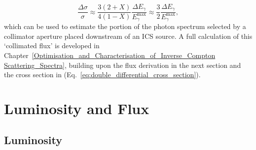 \documentclass[../main.tex]{subfiles}
\begin{document}
\begin{equation}
\frac{\Delta\sigma}{\sigma} \approx \frac{3\left(2+X\right)}{4\left(1-X\right)}\frac{\Delta E_{\gamma}}{E_{\gamma}^{\mathrm{max}}} \approx \frac{3}{2}\frac{\Delta E_{\gamma}}{E_{\gamma}^{\mathrm{max}}},
\label{eq:cross_section_factor}    
\end{equation}
which can be used to estimate the portion of the photon spectrum selected by a collimator aperture placed downstream of an ICS source. A full calculation of this `collimated flux' is developed in Chapter~\ref{Optimisation_and_Characterisation_of_Inverse_Compton Scattering_Spectra}, building upon the flux derivation in the next section and the cross section in (Eq.~\ref{eq:double_differential_cross_section}). 

\section{Luminosity and Flux}
\label{sec:luminosity_and_flux}

\subsection{Luminosity}
\end{document}
